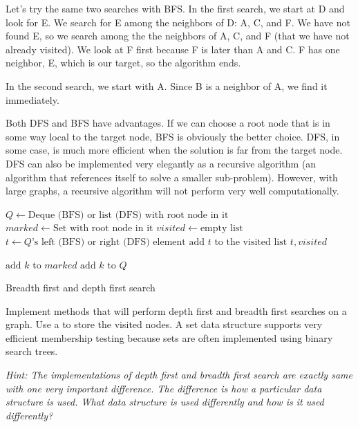 Let's try the same two searches with BFS.
In the first search, we start at D and look for E.
We search for E among the neighbors of D: A, C, and F.
We have not found E, so we search among the the neighbors of A, C, and F (that we have not already visited).
We look at F first because F  is later than A and C.
F has one neighbor, E, which is our target, so the algorithm ends.

In the second search, we start with A.
Since B is a neighbor of A, we find it immediately.

Both DFS and BFS have advantages.
If we can choose a root node that is in some way local to the target node, BFS is obviously the better choice.
DFS, in some case, is much more efficient when the solution is far from the target node.
DFS can also be implemented very elegantly as a recursive algorithm (an algorithm that references itself to solve a smaller sub-problem).
However, with large graphs, a recursive algorithm will not perform very well computationally.

\begin{algorithm}
\begin{algorithmic}[1]
	\State $Q \gets \text{Deque (BFS) or list (DFS) with root node in it}$	
	\State $marked \gets \text{Set with root node in it}$	
	\State $visited \gets \text{empty list}$	
							
		\State $t \gets Q\text{'s left (BFS) or right (DFS) element}$	
		\State $\text{add }t \text{ to the visited list}$
									
			\State {} $t,visited$
		
		\Else										{}
					\State $\text{add } k \text{ to } marked$
					\State $\text{add } k \text{ to } Q$
				\EndIf
			\EndFor
		\EndIf
	\EndWhile
\EndProcedure
\end{algorithmic}
\caption{Breadth first and depth first search}
\label{alg:BFSDFS}
\end{algorithm}

\begin{problem}
Implement methods that will perform depth first and breadth first searches on a graph.
Use a  to store the visited nodes.
A set data structure supports very efficient membership testing because
sets are often implemented using binary search trees.

\textit{Hint: The implementations of depth first and breadth first search are exactly same with one very important difference.
The difference is how a particular data structure is used.  What data structure is used differently and how is it used differently?}
\end{problem}

